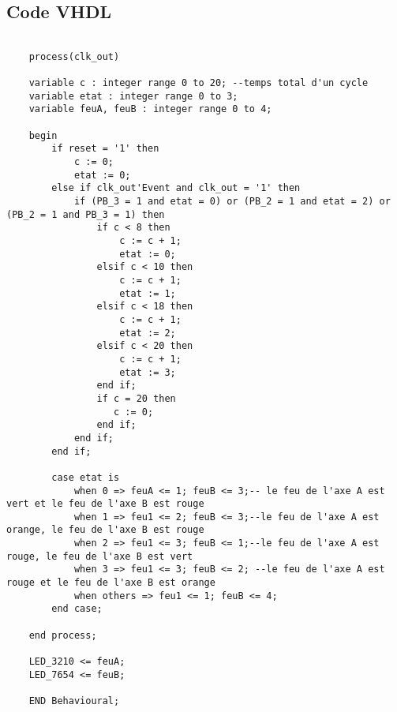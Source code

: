 \documentclass[11pt]{report}
\begin{document}
\subsection{Code VHDL}
\begin{lstlisting}

	process(clk_out)

	variable c : integer range 0 to 20; --temps total d'un cycle
	variable etat : integer range 0 to 3;
	variable feuA, feuB : integer range 0 to 4;

	begin
		if reset = '1' then
			c := 0;
			etat := 0;
		else if clk_out'Event and clk_out = '1' then
			if (PB_3 = 1 and etat = 0) or (PB_2 = 1 and etat = 2) or (PB_2 = 1 and PB_3 = 1) then
				if c < 8 then
					c := c + 1;
					etat := 0;
				elsif c < 10 then
					c := c + 1;
					etat := 1;
				elsif c < 18 then
					c := c + 1;
					etat := 2;
				elsif c < 20 then
					c := c + 1;
					etat := 3;
				end if;
				if c = 20 then
				   c := 0;
				end if;
			end if;
		end if;

		case etat is
			when 0 => feuA <= 1; feuB <= 3;-- le feu de l'axe A est vert et le feu de l'axe B est rouge
			when 1 => feu1 <= 2; feuB <= 3;--le feu de l'axe A est orange, le feu de l'axe B est rouge
			when 2 => feu1 <= 3; feuB <= 1;--le feu de l'axe A est rouge, le feu de l'axe B est vert
			when 3 => feu1 <= 3; feuB <= 2; --le feu de l'axe A est rouge et le feu de l'axe B est orange
			when others => feu1 <= 1; feuB <= 4;
		end case;

	end process;

	LED_3210 <= feuA;
	LED_7654 <= feuB;

	END Behavioural;
  \end{lstlisting}
\end{document}
